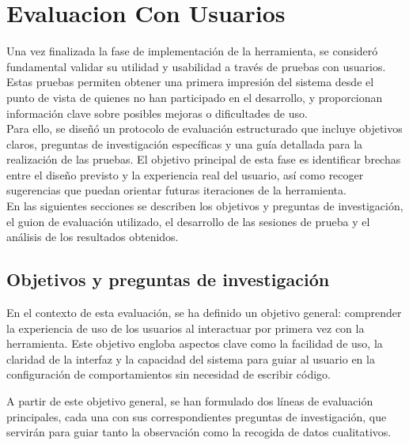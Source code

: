 \setcounter{secnumdepth}{3} %
\chapter{Evaluacion Con Usuarios}
\label{cap:evaluacionConUsuarios}
Una vez finalizada la fase de implementación de la herramienta, se consideró fundamental validar su utilidad y usabilidad a través de pruebas con usuarios. Estas pruebas permiten obtener una primera impresión del sistema desde el punto de vista de quienes no han participado en el desarrollo, y proporcionan información clave sobre posibles mejoras o dificultades de uso.\\

Para ello, se diseñó un protocolo de evaluación estructurado que incluye objetivos claros, preguntas de investigación específicas y una guía detallada para la realización de las pruebas. El objetivo principal de esta fase es identificar brechas entre el diseño previsto y la experiencia real del usuario, así como recoger sugerencias que puedan orientar futuras iteraciones de la herramienta.\\

En las siguientes secciones se describen los objetivos y preguntas de investigación, el guion de evaluación utilizado, el desarrollo de las sesiones de prueba y el análisis de los resultados obtenidos.\\

\section{Objetivos y preguntas de investigación} \label{sec:preguntas}

En el contexto de esta evaluación, se ha definido un objetivo general: comprender la experiencia de uso de los usuarios al interactuar por primera vez con la herramienta. Este objetivo engloba aspectos clave como la facilidad de uso, la claridad de la interfaz y la capacidad del sistema para guiar al usuario en la configuración de comportamientos sin necesidad de escribir código.

A partir de este objetivo general, se han formulado dos líneas de evaluación principales, cada una con sus correspondientes preguntas de investigación, que servirán para guiar tanto la observación como la recogida de datos cualitativos.

